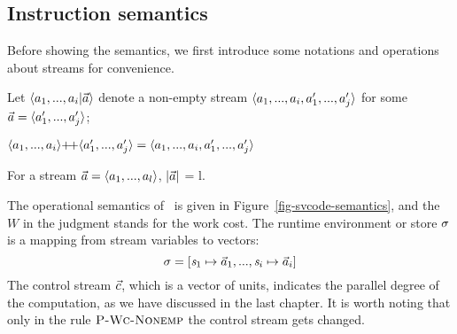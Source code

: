 \subsection{Instruction semantics}

Before showing the semantics, we first introduce some notations and operations about streams for convenience.
\begin{nota} 
	Let $\< a_1,...,a_i | \a \'>$ denote a non-empty stream $\< a_1,...,a_i, a_1',..., a_j' \'>$ for some $\a = \< a'_1,...,a'_j \'>$;
\end{nota}


\begin{nota}
	$\vapp{\vrange{a_1}{a_i}} {\vrange{a_1'}{a_j'}} = \langle a_1,...,a_i,a_1',...,a_j' \rangle $ \\
\end{nota}

\begin{nota}
	For a stream $\a = \< a_1,...,a_l \'>$, $|\vec a|$ = l. \\
\end{nota}
The operational semantics of \fmsvcode \  is given in Figure~\ref{fig-svcode-semantics}, and the $W$ in the judgment stands for the work cost.
The runtime environment or store $\sigma$ is a mapping from stream variables to vectors:
$$\sgm = [\s_1 \|-> {\a_1},...,\s_i \|-> {\a_i}]$$
The control stream $\vec c$, which is a vector of units, indicates the parallel degree of the computation, as we have discussed in the last chapter. 
It is worth noting that only in the rule $\textsc{P-Wc-Nonemp}$ the control stream gets changed.


